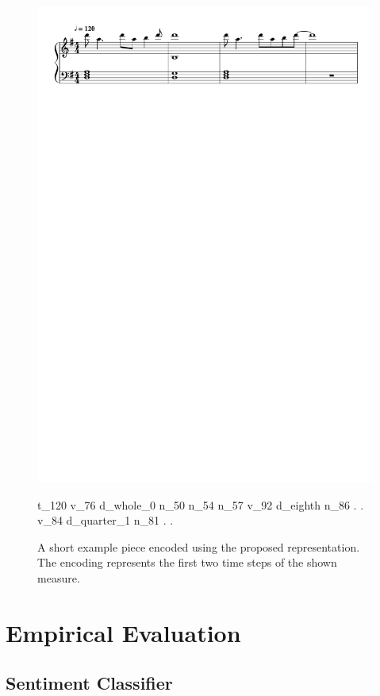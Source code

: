 \begin{figure}[!h]
 \centering
 \includegraphics[width=.9\columnwidth]{imgs/ismir19/encoding.pdf}
\begin{spverbatim}
        t_120 v_76 d_whole_0 n_50 n_54 n_57 v_92 d_eighth n_86 . . v_84
        d_quarter_1 n_81 . .
\end{spverbatim}

 \caption{A short example piece encoded using the proposed representation. The encoding represents the first two time steps of the shown measure.}
 \label{fig:enc_ex}
\end{figure}

\section{Empirical Evaluation}

\subsection{Sentiment Classifier}


